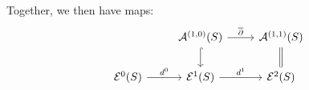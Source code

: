 \documentclass[a4paper]{report}
\theoremstyle{definition}
\theoremstyle{remark}
\theoremstyle{proposition}
\theoremstyle{conjecture}
\theoremstyle{lemma}
\theoremstyle{corollary}
\theoremstyle{exercise}
\theoremstyle{example}
\newcommand{\mcal}{\mathcal}
\begin{document}
Together, we then have maps:
$$%
\begin{tikzcd}
                               & {\mathcal{A}^{(1,0)}(S)} \arrow[r, "\overline{\partial}"] \arrow[d, hook] & {\mcal{A}^{(1,1)}(S)} \arrow[d, no head, equal] \\
\mcal{E}^0(S) \arrow[r, "d^0"] & \mcal{E}^1(S) \arrow[r, "d^1"]                                            & \mcal{E}^2(S)                                       
\end{tikzcd}$$
\end{document}
